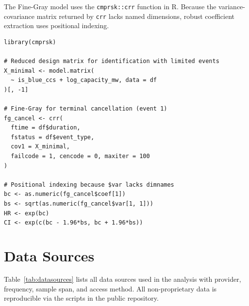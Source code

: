 \documentclass[review,authoryear,11pt]{elsarticle}
\begin{document}
The Fine-Gray model uses the \texttt{cmprsk::crr} function in R. Because the variance-covariance matrix returned by \texttt{crr} lacks named dimensions, robust coefficient extraction uses positional indexing.

\begin{lstlisting}[caption={Fine-Gray competing-risks fit in R.}, label={lst:fg}, basicstyle=\ttfamily\footnotesize, frame=single, backgroundcolor=\color{codebg}, breaklines=true]
library(cmprsk)

# Reduced design matrix for identification with limited events
X_minimal <- model.matrix(
  ~ is_blue_ccs + log_capacity_mw, data = df
)[, -1]

# Fine-Gray for terminal cancellation (event 1)
fg_cancel <- crr(
  ftime = df$duration,
  fstatus = df$event_type,
  cov1 = X_minimal,
  failcode = 1, cencode = 0, maxiter = 100
)

# Positional indexing because $var lacks dimnames
bc <- as.numeric(fg_cancel$coef[1])
bs <- sqrt(as.numeric(fg_cancel$var[1, 1]))
HR <- exp(bc)
CI <- exp(c(bc - 1.96*bs, bc + 1.96*bs))
\end{lstlisting}

\section{Data Sources}

Table~\ref{tab:datasources} lists all data sources used in the analysis with provider, frequency, sample span, and access method. All non-proprietary data is reproducible via the scripts in the public repository.
\end{document}
